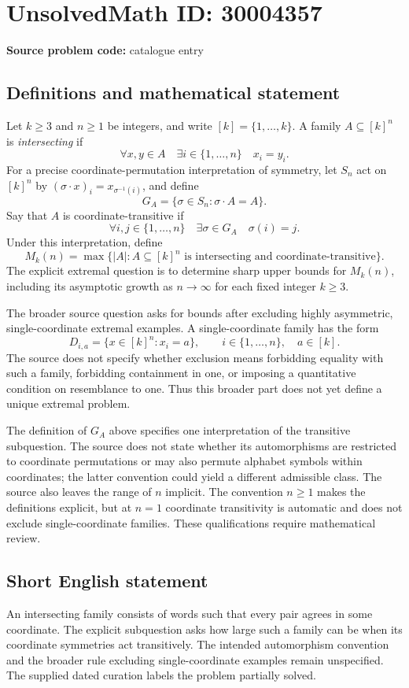 \documentclass[11pt]{article}
\begin{document}
\section*{UnsolvedMath ID: 30004357}
\textbf{Source problem code:} catalogue entry
\subsection{Definitions and mathematical statement}
Let \(k\geq 3\) and \(n\geq 1\) be integers, and write \([k]=\{1,\ldots,k\}\). A family \(A\subseteq[k]^n\) is \emph{intersecting} if
\[
\forall x,y\in A\quad \exists i\in\{1,\ldots,n\}\quad x_i=y_i.
\]
For a precise coordinate-permutation interpretation of symmetry, let \(S_n\) act on \([k]^n\) by \((\sigma\cdot x)_i=x_{\sigma^{-1}(i)}\), and define
\[
G_A=\{\sigma\in S_n:\sigma\cdot A=A\}.
\]
Say that \(A\) is coordinate-transitive if
\[
\forall i,j\in\{1,\ldots,n\}\quad \exists\sigma\in G_A\quad \sigma(i)=j.
\]
Under this interpretation, define
\[
M_k(n)=\max\bigl\{|A|:A\subseteq[k]^n\text{ is intersecting and coordinate-transitive}\bigr\}.
\]
The explicit extremal question is to determine sharp upper bounds for \(M_k(n)\), including its asymptotic growth as \(n\to\infty\) for each fixed integer \(k\geq3\).

The broader source question asks for bounds after excluding highly asymmetric, single-coordinate extremal examples. A single-coordinate family has the form
\[
D_{i,a}=\{x\in[k]^n:x_i=a\},\qquad i\in\{1,\ldots,n\},\quad a\in[k].
\]
The source does not specify whether exclusion means forbidding equality with such a family, forbidding containment in one, or imposing a quantitative condition on resemblance to one. Thus this broader part does not yet define a unique extremal problem.

The definition of \(G_A\) above specifies one interpretation of the transitive subquestion. The source does not state whether its automorphisms are restricted to coordinate permutations or may also permute alphabet symbols within coordinates; the latter convention could yield a different admissible class. The source also leaves the range of \(n\) implicit. The convention \(n\geq1\) makes the definitions explicit, but at \(n=1\) coordinate transitivity is automatic and does not exclude single-coordinate families. These qualifications require mathematical review.
\subsection{Short English statement}
An intersecting family consists of words such that every pair agrees in some coordinate. The explicit subquestion asks how large such a family can be when its coordinate symmetries act transitively. The intended automorphism convention and the broader rule excluding single-coordinate examples remain unspecified. The supplied dated curation labels the problem partially solved.
\end{document}
